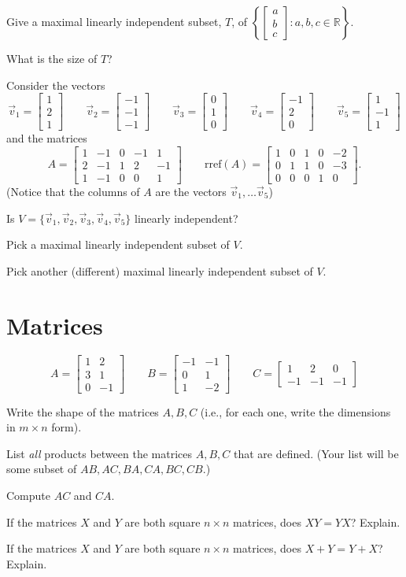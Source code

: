 \documentclass[letter]{article}
\newcommand{\R}{\mathbb{R}}
\newcommand{\rref}{\mathrm{rref}}
\newcommand{\mat}[1]{\begin{bmatrix}#1\end{bmatrix}}
\begin{document}
	\begin{Enum}
		\item Give a maximal linearly independent subset, $T$, of
		$\left\{\mat{a\\b\\c}:a,b,c\in \R\right\}$.
		\item What is the size of $T$?
	\end{Enum}

	Consider the vectors
	\[
		\vec v_1=\mat{1\\2\\1}
		\qquad
		\vec v_2=\mat{-1\\-1\\-1}
		\qquad
		\vec v_3=\mat{0\\1\\0}
		\qquad
		\vec v_4=\mat{-1\\2\\0}
		\qquad
		\vec v_5=\mat{1\\-1\\1}
	\]
	and the matrices
	\[
		A=\mat{1&-1&0&-1&1\\ 2&-1&1&2&-1\\1 & -1&0&0&1}
		\qquad \rref (A)
		=\mat{1&0&1&0&-2\\0&1&1&0&-3\\0&0&0&1&0}.
	\]
	(Notice that the columns of $A$ are the vectors $\vec v_1,\ldots \vec v_5$)

	\begin{Enum}
		\item Is $V=\{\vec v_1,\vec v_2,\vec v_3,\vec v_4,\vec v_5\}$ linearly
		independent?
		\item Pick a maximal linearly independent subset of $V$.
		\item Pick another (different) maximal linearly independent subset of $V$.
	\end{Enum}

\newpage
\section*{Matrices}
	\[
		A=\mat{1&2\\3&1\\0&-1}
		\qquad
		B=\mat{-1&-1\\0&1\\1&-2}
		\qquad
		C=\mat{1&2&0\\-1&-1&-1}
	\]
	\begin{Enum}
		\item Write the shape of the matrices $A,B,C$ (i.e., for each one,
		write the dimensions in $m\times n$ form).
		\item List \emph{all} products between the matrices $A,B,C$ that are
		defined. (Your list will be some subset of $AB,AC,BA,CA,BC,CB$.)
		\item Compute $AC$ and $CA$.
	\end{Enum}
	\begin{Enum}
		\item If the matrices $X$ and $Y$ are both square $n\times n$ matrices,
		does $XY=YX$?  Explain.
		\item If the matrices $X$ and $Y$ are both square $n\times n$ matrices,
		does $X+Y=Y+X$?  Explain.
	\end{Enum}
\end{document}
